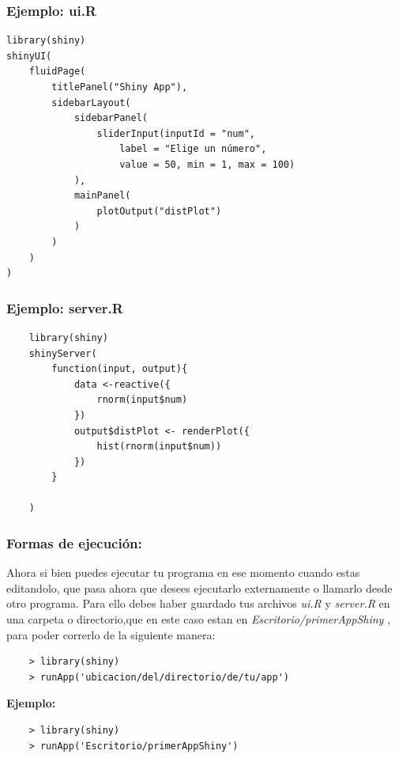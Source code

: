 \documentclass{beamer}
\begin{document}
\begin{frame}[fragile]
\frametitle{Ejemplo: \textbf{ui.R}}
\begin{verbatim}
library(shiny)
shinyUI(
    fluidPage(
        titlePanel("Shiny App"),
        sidebarLayout(
            sidebarPanel(
                sliderInput(inputId = "num",
                    label = "Elige un número",
                    value = 50, min = 1, max = 100)
            ),
            mainPanel(
                plotOutput("distPlot")
            )
        )
    )
)
\end{verbatim}
\end{frame}
\begin{frame}[fragile]
	\frametitle{Ejemplo: \textbf{server.R}}
	\begin{verbatim}
	library(shiny)
	shinyServer(
	    function(input, output){
	        data <-reactive({
	            rnorm(input$num)
	        })
	        output$distPlot <- renderPlot({
	            hist(rnorm(input$num))
	        })
	    }
	
	)
	\end{verbatim}
\end{frame}

\begin{frame}[fragile]
	\frametitle{Formas de ejecución:}
	Ahora si bien puedes ejecutar tu programa en ese momento cuando estas editandolo, que pasa ahora que desees ejecutarlo externamente o llamarlo desde otro programa.
	Para ello debes haber guardado tus archivos \textit{ui.R }y \textit{server.R} en una carpeta o directorio,que en este caso estan en \textit{Escritorio/primerAppShiny} , para poder correrlo de la siguiente manera:
	\begin{verbatim}
	> library(shiny)
	> runApp('ubicacion/del/directorio/de/tu/app')
	\end{verbatim}
	
	\textbf{Ejemplo: }
	\begin{verbatim}
	> library(shiny)
	> runApp('Escritorio/primerAppShiny')
	\end{verbatim}
\end{frame}
\end{document}
